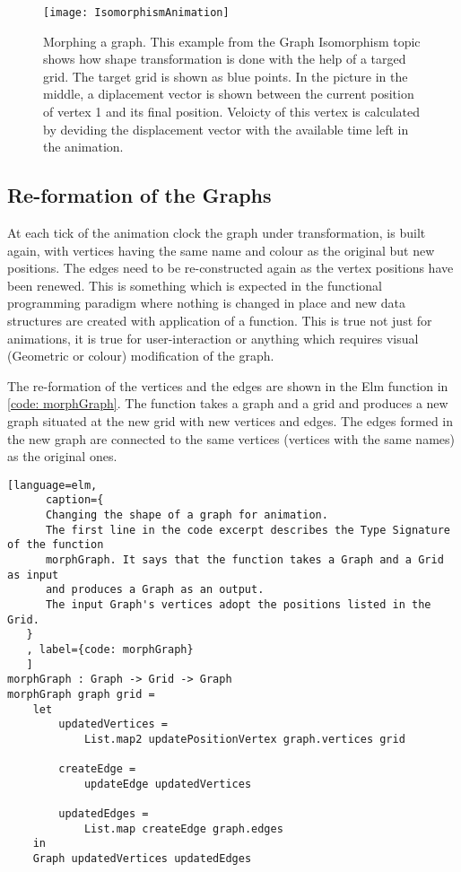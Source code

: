 \begin{figure}[h]
\centering
\texttt{[image: IsomorphismAnimation]}
\caption{
        Morphing a graph. This example from the Graph Isomorphism topic
        shows how shape transformation is done with the help of a targed grid.
        The target grid is shown as blue points. In the picture in the middle,
        a diplacement vector is shown between the current position of vertex 1
        and its final position. Veloicty of this vertex is calculated by deviding
        the displacement vector with the available time left in the animation.
        }
\label{animationfigure: isomorphism}
\end{figure}

\subsection{Re-formation of the Graphs}
At each tick of the animation clock the graph under transformation, is built
again, with vertices having the same name and colour as the original but new
positions. The edges need to be re-constructed again as the vertex positions
have been renewed. This is something which is expected in the functional
programming paradigm where nothing is changed in place and new data structures
are created with application of a function. This is true not just for
animations, it is true for user-interaction or anything which requires visual
(Geometric or colour) modification of the graph.

The re-formation of the vertices and the edges are shown in
the Elm function in \autoref{code: morphGraph}. The function takes a
graph and a grid and produces a new graph situated at the new grid with new
vertices and edges. The edges formed in the new graph are connected to the
same vertices (vertices with the same names) as the original ones.

\begin{lstlisting}[language=elm, 
      caption={
      Changing the shape of a graph for animation.
      The first line in the code excerpt describes the Type Signature of the function
      morphGraph. It says that the function takes a Graph and a Grid as input
      and produces a Graph as an output.
      The input Graph's vertices adopt the positions listed in the Grid.
   }
   , label={code: morphGraph}
   ]
morphGraph : Graph -> Grid -> Graph
morphGraph graph grid =
    let
        updatedVertices =
            List.map2 updatePositionVertex graph.vertices grid

        createEdge =
            updateEdge updatedVertices

        updatedEdges =
            List.map createEdge graph.edges
    in
    Graph updatedVertices updatedEdges

\end{lstlisting}

